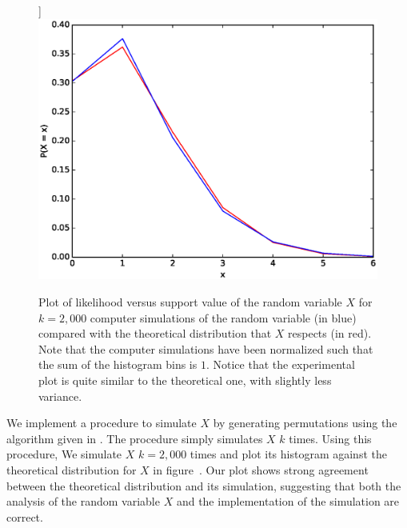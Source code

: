 \documentclass[11pt, oneside]{article}   	%
\begin{document}
\begin{figure}]\label{fig:x}
\includegraphics[scale=.5]{part_1_problem_4}
\caption{Plot of likelihood versus support value of the random variable $X$ for $k = 2,000$ computer simulations of the random variable (in blue) compared with the theoretical distribution that $X$ respects (in red). Note that the computer simulations have been normalized such that the sum of the histogram bins is $1$. Notice that the experimental plot is quite similar to the theoretical one, with slightly less variance.}
\end{figure}

We implement a procedure to simulate $X$ by generating permutations using the algorithm given in \label{sssec:perm}. The procedure simply simulates $X$ $k$ times. Using this procedure, We simulate $X$ $k = 2,000$ times and plot its histogram against the theoretical distribution for $X$ in figure~\label{fig:x}. Our plot shows strong agreement between the theoretical distribution and its simulation, suggesting that both the analysis of the random variable $X$ and the implementation of the simulation are correct.

\subsection{}
\end{document}

